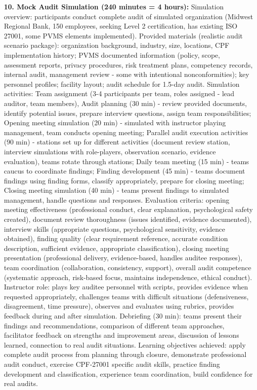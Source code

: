 \documentclass[11pt,a4paper]{article}
\begin{document}
\textbf{10. Mock Audit Simulation (240 minutes = 4 hours):} Simulation overview: participants conduct complete audit of simulated organization (Midwest Regional Bank, 150 employees, seeking Level 2 certification, has existing ISO 27001, some PVMS elements implemented). Provided materials (realistic audit scenario package): organization background, industry, size, locations, CPF implementation history; PVMS documented information (policy, scope, assessment reports, privacy procedures, risk treatment plans, competency records, internal audit, management review - some with intentional nonconformities); key personnel profiles; facility layout; audit schedule for 1.5-day audit. Simulation activities: Team assignment (3-4 participants per team, roles assigned - lead auditor, team members), Audit planning (30 min) - review provided documents, identify potential issues, prepare interview questions, assign team responsibilities; Opening meeting simulation (20 min) - simulated with instructor playing management, team conducts opening meeting; Parallel audit execution activities (90 min) - stations set up for different activities (document review station, interview simulations with role-players, observation scenario, evidence evaluation), teams rotate through stations; Daily team meeting (15 min) - teams caucus to coordinate findings; Finding development (45 min) - teams document findings using finding forms, classify appropriately, prepare for closing meeting; Closing meeting simulation (40 min) - teams present findings to simulated management, handle questions and responses. Evaluation criteria: opening meeting effectiveness (professional conduct, clear explanation, psychological safety created), document review thoroughness (issues identified, evidence documented), interview skills (appropriate questions, psychological sensitivity, evidence obtained), finding quality (clear requirement reference, accurate condition description, sufficient evidence, appropriate classification), closing meeting presentation (professional delivery, evidence-based, handles auditee responses), team coordination (collaboration, consistency, support), overall audit competence (systematic approach, risk-based focus, maintains independence, ethical conduct). Instructor role: plays key auditee personnel with scripts, provides evidence when requested appropriately, challenges teams with difficult situations (defensiveness, disagreement, time pressure), observes and evaluates using rubrics, provides feedback during and after simulation. Debriefing (30 min): teams present their findings and recommendations, comparison of different team approaches, facilitator feedback on strengths and improvement areas, discussion of lessons learned, connection to real audit situations. Learning objectives achieved: apply complete audit process from planning through closure, demonstrate professional audit conduct, exercise CPF-27001 specific audit skills, practice finding development and classification, experience team coordination, build confidence for real audits.
\end{document}

